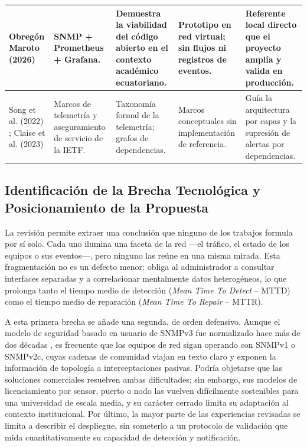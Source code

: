 \begin{table}[htbp]
\begin{tabular}{|p{2.1cm}|p{2.3cm}|p{2.8cm}|p{2.8cm}|p{2.8cm}|}
    \hline
    Obregón Maroto (2026) \cite{obregon2026implementacion} & SNMP + Prometheus + Grafana. & Demuestra la viabilidad del código abierto en el contexto académico ecuatoriano. & Prototipo en red virtual; sin flujos ni registros de eventos. & Referente local directo que el proyecto amplía y valida en producción. \\
    \hline
    Song et al. (2022) \cite{song2022network}; Claise et al. (2023) \cite{claise2023sain} & Marcos de telemetría y aseguramiento de servicio de la IETF. & Taxonomía formal de la telemetría; grafos de dependencias. & Marcos conceptuales sin implementación de referencia. & Guía la arquitectura por capas y la supresión de alertas por dependencias. \\
    \hline
  \end{tabular}
  \par\vspace{1.5mm}
\end{table}

\subsection{Identificación de la Brecha Tecnológica y Posicionamiento de la Propuesta}

La revisión permite extraer una conclusión que ninguno de los trabajos formula por sí solo. Cada uno ilumina una faceta de la red ---el tráfico, el estado de los equipos o sus eventos---, pero ninguno las reúne en una misma mirada. Esta fragmentación no es un defecto menor: obliga al administrador a consultar interfaces separadas y a correlacionar mentalmente datos heterogéneos, lo que prolonga tanto el tiempo medio de detección (\textit{Mean Time To Detect} -- MTTD) como el tiempo medio de reparación (\textit{Mean Time To Repair} -- MTTR).

A esta primera brecha se añade una segunda, de orden defensivo. Aunque el modelo de seguridad basado en usuario de SNMPv3 fue normalizado hace más de dos décadas \cite{blumenthal2002user}, es frecuente que los equipos de red sigan operando con SNMPv1 o SNMPv2c, cuyas cadenas de comunidad viajan en texto claro y exponen la información de topología a interceptaciones pasivas. Podría objetarse que las soluciones comerciales resuelven ambas dificultades; sin embargo, sus modelos de licenciamiento por sensor, puerto o nodo las vuelven difícilmente sostenibles para una universidad de escala media, y su carácter cerrado limita su adaptación al contexto institucional. Por último, la mayor parte de las experiencias revisadas se limita a describir el despliegue, sin someterlo a un protocolo de validación que mida cuantitativamente su capacidad de detección y notificación.

